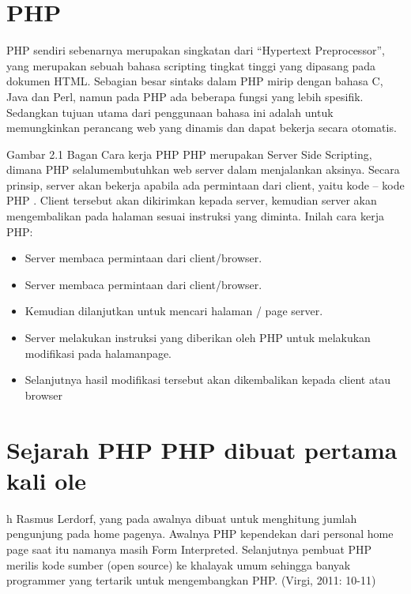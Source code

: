 \documentclass{jtetiproposalskripsi}
\begin{document}
\section{PHP} 
	PHP sendiri sebenarnya merupakan singkatan dari “Hypertext Preprocessor”, yang merupakan sebuah bahasa scripting tingkat tinggi yang dipasang pada dokumen HTML. Sebagian besar sintaks dalam PHP mirip dengan bahasa C, Java dan Perl, namun pada PHP ada beberapa fungsi yang lebih  spesifik. Sedangkan tujuan utama dari penggunaan bahasa ini adalah untuk memungkinkan perancang web yang dinamis dan dapat bekerja secara otomatis.
 
Gambar 2.1 Bagan Cara kerja PHP
PHP merupakan Server Side Scripting, dimana PHP selalumembutuhkan web server dalam menjalankan aksinya. Secara prinsip, server akan bekerja apabila ada permintaan dari client, yaitu kode – kode PHP . Client tersebut akan dikirimkan kepada server, kemudian server akan mengembalikan pada halaman sesuai instruksi yang diminta. Inilah cara kerja PHP:
\begin{itemize}
\item 	Server membaca permintaan dari client/browser.
\item 	Server membaca permintaan dari client/browser.
\item 	Kemudian dilanjutkan untuk mencari halaman / page server.
\item 	Server melakukan instruksi yang diberikan oleh PHP untuk melakukan modifikasi pada halamanpage.
\item 	Selanjutnya hasil modifikasi tersebut akan dikembalikan kepada client atau browser
\end{itemize}

\section{Sejarah PHP
 	PHP dibuat pertama kali ole}h Rasmus Lerdorf, yang pada awalnya dibuat untuk menghitung jumlah pengunjung pada home pagenya. Awalnya PHP kependekan dari personal home page saat itu namanya masih Form Interpreted. Selanjutnya pembuat PHP merilis kode sumber (open source) ke khalayak umum sehingga banyak programmer yang tertarik untuk mengembangkan PHP. (Virgi, 2011: 10-11)
\end{document}
